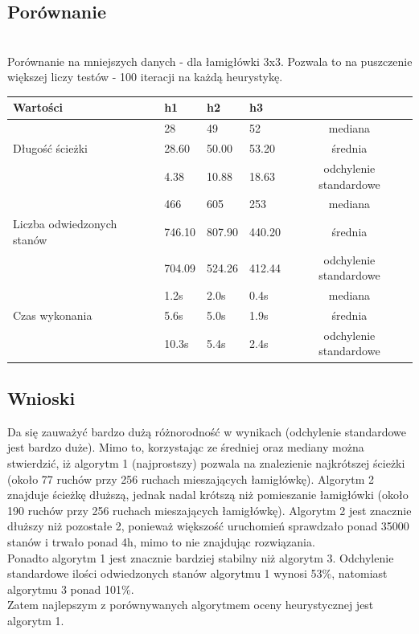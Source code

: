 \vspace{3cm}

\subsection*{Porównanie}
\phantom{.}\\
Porównanie na mniejszych danych - dla łamigłówki 3x3. Pozwala to na puszczenie większej liczy testów - 100 iteracji na każdą heurystykę.\\

\begin{tabular}{ |M{3.5cm}|M{2cm}|M{2cm}|M{2cm}|c| } 
    \hline
    Wartości & h1 & h2 & h3 & \\
    \hline
                    & 28    & 49    & 52 & mediana \\
    Długość ścieżki & 28.60 & 50.00 & 53.20 & średnia \\
                    & 4.38  & 10.88 & 18.63 & odchylenie standardowe \\
    \hline
                               & 466    & 605    & 253    & mediana \\
    Liczba odwiedzonych stanów & 746.10 & 807.90 & 440.20 & średnia \\
                               & 704.09 & 524.26 & 412.44 & odchylenie standardowe \\
    \hline
                   & 1.2s  & 2.0s & 0.4s & mediana \\
    Czas wykonania & 5.6s  & 5.0s & 1.9s & średnia \\
                   & 10.3s & 5.4s & 2.4s & odchylenie standardowe \\
    \hline
\end{tabular}

\subsection*{Wnioski}
Da się zauważyć bardzo dużą różnorodność w wynikach (odchylenie standardowe jest bardzo duże). Mimo to, korzystając ze średniej oraz mediany można stwierdzić, iż algorytm 1 (najprostszy) pozwala na znalezienie najkrótszej ścieżki (około 77 ruchów przy 256 ruchach mieszających łamigłówkę). Algorytm 2 znajduje ścieżkę dłuższą, jednak nadal krótszą niż pomieszanie łamigłówki (około 190 ruchów przy 256 ruchach mieszających łamigłówkę).
Algorytm 2 jest znacznie dłuższy niż pozostałe 2, ponieważ większość uruchomień sprawdzało ponad 35000 stanów i trwało ponad 4h, mimo to nie znajdując rozwiązania.\\
Ponadto algorytm 1 jest znacznie bardziej stabilny niż algorytm 3. Odchylenie standardowe ilości odwiedzonych stanów algorytmu 1 wynosi 53\%, natomiast algorytmu 3 ponad 101\%.\\
Zatem najlepszym z porównywanych algorytmem oceny heurystycznej jest algorytm 1.
